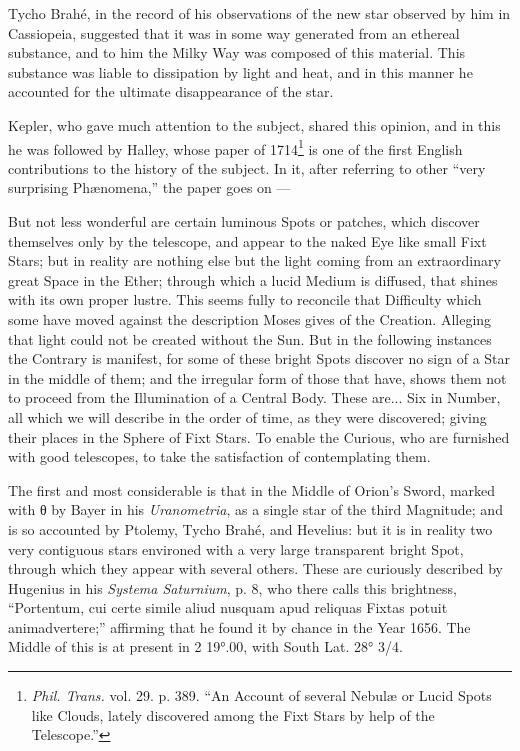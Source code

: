 \documentclass[a4paper, 12pt, oneside, polutonikogreek, english]{article}
\begin{document}
Tycho Brahé, in the record of his observations of the new star observed by him in Cassiopeia, suggested that it was in some way generated from an ethereal substance, and to him the Milky Way was composed of this material. This substance was liable to dissipation by light and heat, and in this manner he accounted for the ultimate disappearance of the star.

Kepler, who gave much attention to the subject, shared this opinion, and in this he was followed by Halley, whose paper of 1714\footnote{\emph{Phil. Trans.} vol. 29. p. 389. ``An Account of several Nebulæ or Lucid Spots like Clouds, lately discovered among the Fixt Stars by help of the Telescope.''} is one of the first English contributions to the history of the subject. In it, after referring to other ``very surprising Phænomena,'' the paper goes on ---

But not less wonderful are certain luminous Spots or patches, which discover themselves only by the telescope, and appear to the naked Eye like small Fixt Stars; but in reality are nothing else but the light coming from an extraordinary great Space in the Ether; through which a lucid Medium is diffused, that shines with its own proper lustre. This seems fully to reconcile that Difficulty which some have moved against the description Moses gives of the Creation. Alleging that light could not be created without the Sun. But in the following instances the Contrary is manifest, for some of these bright Spots discover no sign of a Star in the middle of them; and the irregular form of those that have, shows them not to proceed from the Illumination of a Central Body. These are... Six in Number, all which we will describe in the order of time, as they were discovered; giving their places in the Sphere of Fixt Stars. To enable the Curious, who are furnished with good telescopes, to take the satisfaction of contemplating them.

The first and most considerable is that in the Middle of Orion's Sword, marked with θ by Bayer in his \emph{Uranometria}, as a single star of the third Magnitude; and is so accounted by Ptolemy, Tycho Brahé, and Hevelius: but it is in reality two very contiguous stars environed with a very large transparent bright Spot, through which they appear with several others. These are curiously described by Hugenius in his \emph{Systema Saturnium}, p. 8, who there calls this brightness, ``Portentum, cui certe simile aliud nusquam apud reliquas Fixtas potuit animadvertere;'' affirming that he found it by chance in the Year 1656. The Middle of this is at present in 2 19°.00, with South Lat. 28° 3/4.
\end{document}
